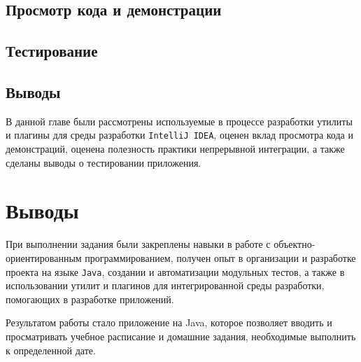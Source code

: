 \subsection{Просмотр кода и демонстрации}

\subsection{Тестирование}

\subsection{Выводы}

В данной главе были рассмотрены используемые в процессе разработки утилиты и плагины для среды разработки \texttt{IntelliJ IDEA}, оценен вклад просмотра кода и демонстраций, оценена полезность практики непрерывной интеграции, а также сделаны выводы о тестировании приложения.

\section{Выводы}

При выполнении задания были закреплены навыки в работе с объектно-ориентированным программированием, получен опыт в организации и разработке проекта на языке \texttt{Java}, создании и автоматизации модульных тестов, а также в использовании утилит и плагинов для интегрированной среды разработки, помогающих в разработке приложений.

Результатом работы стало приложение на Java, которое позволяет вводить и просматривать учебное расписание и домашние задания, необходимые выполнить к определенной дате.

